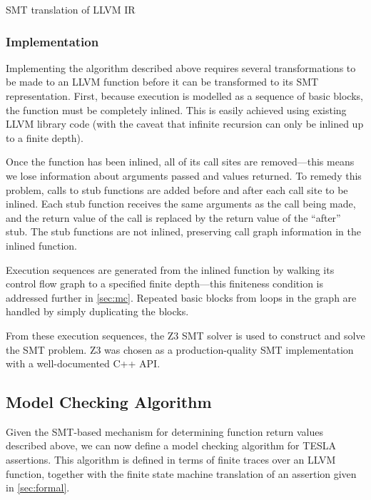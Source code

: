 \begin{listing}
  \begin{verbatim}
  \end{verbatim}
  \caption{SMT translation of LLVM IR}
  \label{fig:smt-example}
\end{listing}

\subsubsection{Implementation}

Implementing the algorithm described above requires several transformations to
be made to an LLVM function before it can be transformed to its SMT
representation. First, because execution is modelled as a sequence of basic
blocks, the function must be completely inlined. This is easily achieved using
existing LLVM library code (with the caveat that infinite recursion can only be
inlined up to a finite depth).

Once the function has been inlined, all of its call sites are removed---this
means we lose information about arguments passed and values returned. To remedy
this problem, calls to stub functions are added before and after each call site
to be inlined. Each stub function receives the same arguments as the call being
made, and the return value of the call is replaced by the return value of the
``after'' stub. The stub functions are not inlined, preserving call graph
information in the inlined function.

Execution sequences are generated from the inlined function by walking its
control flow graph to a specified finite depth---this finiteness condition is
addressed further in \autoref{sec:mc}. Repeated basic blocks from loops in the
graph are handled by simply duplicating the blocks.

From these execution sequences, the Z3 SMT solver \cite{de_moura_z3:_2008} is
used to construct and solve the SMT problem. Z3 was chosen as a
production-quality SMT implementation with a well-documented C++ API.

\subsection{Model Checking Algorithm} \label{sec:mc}

Given the SMT-based mechanism for determining function return values described
above, we can now define a model checking algorithm for TESLA assertions. This
algorithm is defined in terms of finite traces over an LLVM function, together
with the finite state machine translation of an assertion given in
\autoref{sec:formal}.

